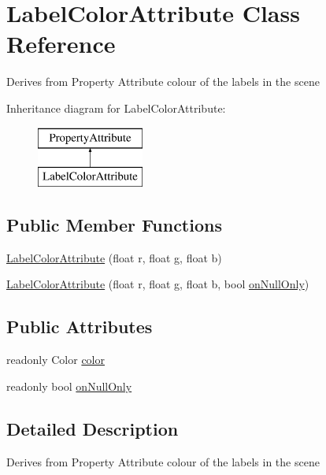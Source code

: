 \hypertarget{class_label_color_attribute}{}\section{Label\+Color\+Attribute Class Reference}
\label{class_label_color_attribute}


Derives from Property Attribute colour of the labels in the scene  


Inheritance diagram for Label\+Color\+Attribute\+:\begin{figure}[H]
\begin{center}
\leavevmode
\includegraphics[height=2.000000cm]{class_label_color_attribute}
\end{center}
\end{figure}
\subsection*{Public Member Functions}
\begin{DoxyCompactItemize}
\item 
\mbox{\hyperlink{class_label_color_attribute_a02177b63cf4ff0149ca1c16de26ae719}{Label\+Color\+Attribute}} (float r, float g, float b)
\item 
\mbox{\hyperlink{class_label_color_attribute_aeb74525f7fe296360ab5dfa1e8ee718c}{Label\+Color\+Attribute}} (float r, float g, float b, bool \mbox{\hyperlink{class_label_color_attribute_a72065bf4f5842783a1d3f78963421dba}{on\+Null\+Only}})
\end{DoxyCompactItemize}
\subsection*{Public Attributes}
\begin{DoxyCompactItemize}
\item 
readonly Color \mbox{\hyperlink{class_label_color_attribute_aface44d733139b93a6405875dd520d2f}{color}}
\item 
readonly bool \mbox{\hyperlink{class_label_color_attribute_a72065bf4f5842783a1d3f78963421dba}{on\+Null\+Only}}
\end{DoxyCompactItemize}


\subsection{Detailed Description}
Derives from Property Attribute colour of the labels in the scene 



